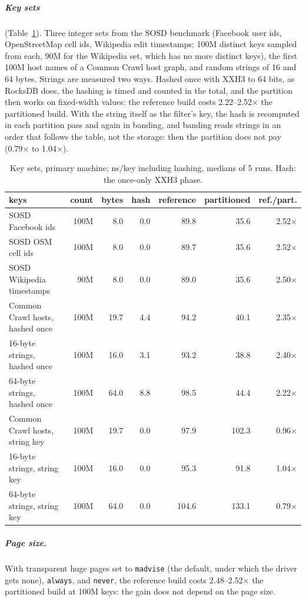 \documentclass[a4paper,UKenglish,cleveref,autoref,thm-restate,anonymous]{lipics-v2021}
\begin{document}
\subparagraph*{Key sets} (Table~\ref{tab:esevenkeys}). Three integer sets from the SOSD
benchmark (Facebook user ids, OpenStreetMap cell ids, Wikipedia edit timestamps; 100M distinct
keys sampled from each, 90M for the Wikipedia set, which has no more distinct keys), the first
100M host names of a Common Crawl host graph, and random strings of 16 and 64 bytes. Strings are
measured two ways. Hashed once with XXH3 to 64 bits, as RocksDB does, the hashing is timed and
counted in the total, and the partition then works on fixed-width values: the reference build
costs 2.22--2.52$\times$ the partitioned build. With the string itself as the
filter's key, the hash is recomputed in each partition pass and again in banding, and banding
reads strings in an order that follows the table, not the storage: then the partition does not
pay (0.79$\times$ to 1.04$\times$).

\begin{table}
\caption{Key sets, primary machine; ns/key including hashing, medians of 5 runs. Hash: the
once-only XXH3 phase.}
\label{tab:esevenkeys}
\small\setlength{\tabcolsep}{3.5pt}
\begin{tabular}{lrrrrrr}
\toprule
keys & count & bytes & hash & reference & partitioned & ref./part. \\
\midrule
SOSD Facebook ids & 100M & 8.0 & 0.0 & 89.8 & 35.6 & 2.52$\times$ \\
SOSD OSM cell ids & 100M & 8.0 & 0.0 & 89.7 & 35.6 & 2.52$\times$ \\
SOSD Wikipedia timestamps & 90M & 8.0 & 0.0 & 89.0 & 35.6 & 2.50$\times$ \\
Common Crawl hosts, hashed once & 100M & 19.7 & 4.4 & 94.2 & 40.1 & 2.35$\times$ \\
16-byte strings, hashed once & 100M & 16.0 & 3.1 & 93.2 & 38.8 & 2.40$\times$ \\
64-byte strings, hashed once & 100M & 64.0 & 8.8 & 98.5 & 44.4 & 2.22$\times$ \\
\midrule
Common Crawl hosts, string key & 100M & 19.7 & 0.0 & 97.9 & 102.3 & 0.96$\times$ \\
16-byte strings, string key & 100M & 16.0 & 0.0 & 95.3 & 91.8 & 1.04$\times$ \\
64-byte strings, string key & 100M & 64.0 & 0.0 & 104.6 & 133.1 & 0.79$\times$ \\
\bottomrule
\end{tabular}
\end{table}

\subparagraph*{Page size.} With transparent huge pages set to \texttt{madvise} (the default, under
which the driver gets none), \texttt{always}, and \texttt{never}, the reference build costs
2.48--2.52$\times$ the partitioned build at 100M keys: the gain does not depend
on the page size.
\end{document}

